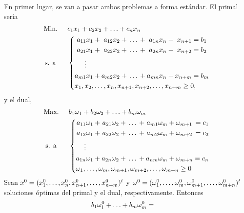 \documentclass[11pt]{report}
\makeatletter
\renewenvironment{proof}[1][\proofname]{\par
  \pushQED{\qed}%
  \normalfont \topsep\z@skip %
  \trivlist
  \item[\hskip\labelsep
        \itshape
    #1\@addpunct{.}]\ignorespaces
}{%
  \popQED\endtrivlist\@endpefalse
}
\theoremstyle{mytheorem}
\theoremstyle{mydefinition}
\theoremstyle{myexample}
\let\oldproofname=\proofname
\renewcommand{\proofname}{\rm\bf{\oldproofname}}}
\makeatother
\begin{document}
\begin{proof}
En primer lugar, se van a pasar ambos problemas a forma estándar. El primal sería
\[\begin{aligned}[t]
&\text{Min. } &&c_1x_1+c_2x_2+\mathellipsis+c_nx_n \\
& \, \text{s. a} && \left\{\begin{alignedat}{10}
& & a_{11}&x_1 & {}+{} & & a_{12}&x_2 {}+{} \mathellipsis {}+{} & a_{1n}&x_n {}-{} & x_{n+1} & {}={} b_1 \\
& & a_{21}&x_1 & {}+{} & & a_{22}&x_2 {}+{} \mathellipsis {}+{} & a_{2n}&x_n {}-{} & x_{n+2} & {}={} b_2 \\
& & \vdots \\
& & a_{m1}&x_1 & {}+{} & & a_{m2}&x_2 {}+{} \mathellipsis {}+{} & a_{mn}&x_n {}-{} & x_{n+m} & {}={} b_m \\
& \mathrlap{x_1, x_2,\mathellipsis,x_n,x_{n+1},x_{n+2},\mathellipsis,x_{n+m} \geq 0,} \\
\end{alignedat}\right.
\end{aligned}\]
y el dual,
\[\begin{aligned}[t]
&\text{Max. } &&b_1\omega_1+b_2\omega_2+\mathellipsis+b_m\omega_m \\
& \; \text{s. a} &&\left\{\begin{alignedat}{10}
& & a_{11}&\omega_1 & {}+{} & & a_{21}&\omega_2 {}+{} \mathellipsis {}+{} & a_{m1}& \omega_m {}+{} \omega_{m+1} & {}={} c_1 \\
& & a_{12}&\omega_1 & {}+{} & & a_{22}&\omega_2 {}+{} \mathellipsis {}+{} & a_{m2}& \omega_m {}+{} \omega_{m+2} & {}={} c_2 \\
& & \vdots \\
& & a_{1n}&\omega_1 & {}+{} & & a_{2n}&\omega_2 {}+{} \mathellipsis {}+{} & a_{nm}& \omega_m {}+{} \omega_{m+n} & {}={} c_n \\
& \mathrlap{\omega_1,\mathellipsis,\omega_m,\omega_{m+1}, \omega_{m+2},\mathellipsis,\omega_{m+n} \geq 0} \\
\end{alignedat}\right.
\end{aligned}\]
Sean $x^0 =(x_1^0,\mathellipsis,x_n^0,x_{n+1}^0,\mathellipsis,x_{n+m}^0)^t$ y $\omega^0 = (\omega_1^0,\mathellipsis,\omega_m^0,\omega_{m+1}^0,\mathellipsis,\omega_{m+n}^0)^t$ soluciones óptimas del primal y el dual, respectivamente. Entonces
\[
\begin{aligned}[t]
b_1\omega_1^0+\mathellipsis+b_m\omega_m^0 &= \begin{aligned}[t]

\end{aligned}
\end{aligned}\]
\end{proof}
\end{document}
